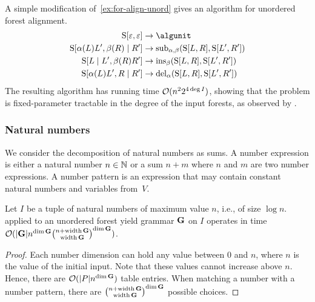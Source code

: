 \begin{example}\label{ex:for-align-unord}
%
    A simple modification of~\cref{ex:for-align-unord} gives an algorithm for unordered forest alignment.
    \begin{align*}
        \gramnt{S}[\varepsilon, \varepsilon] &\rightarrow \algunit \\
        \gramnt{S}[\alpha(L)L', \beta(R) \mid R'] &\rightarrow
            \algsym{sub}_{\alpha,\beta}(\gramnt{S}[L, R], \gramnt{S}[L', R']) \\
        \gramnt{S}[L \mid L', \beta(R)R'] &\rightarrow
            \algsym{ins}_{\beta}(\gramnt{S}[L, R], \gramnt{S}[L', R']) \\
        \gramnt{S}[\alpha(L)L', R \mid R'] &\rightarrow
            \algsym{del}_{\alpha}(\gramnt{S}[L, R], \gramnt{S}[L', R'])
    \end{align*}
    The resulting algorithm has running time \(\bigo(n^22^{4\deg I})\), showing that the problem is fixed-parameter tractable in the degree of the input forests, as observed by \textcite{Jiang1995AlignmentTreesAlternative}.
\end{example}

\subsubsection{Natural numbers}

We consider the decomposition of natural numbers as sums.
A number expression is either a natural number \(n \in \nat\) or a sum \(n + m\) where \(n\) and \(m\) are two number expressions.
A number pattern is an expression that may contain constant natural numbers and variables from~\(V\).

\begin{theorem}
    Let \(I\) be a tuple of natural numbers of maximum value \(n\), i.e., of size \(\log n\).
     applied to an unordered forest yield grammar \(\gram\) on \(I\) operates in time
    \(\bigo(|\gram|n^{\dim\gram}\binom{n+\width\gram}{\width\gram}^{\dim\gram})\).
\end{theorem}
\begin{proof}
    Each number dimension can hold any value between \(0\) and \(n\), where \(n\) is the value of the initial input.
    Note that these values cannot increase above \(n\).
    Hence, there are \(\bigo(|P|n^{\dim\gram})\) table entries.
    When matching a number with a number pattern, there are \(\binom{n+\width\gram}{\width\gram}^{\dim\gram}\) possible choices.
\end{proof}

